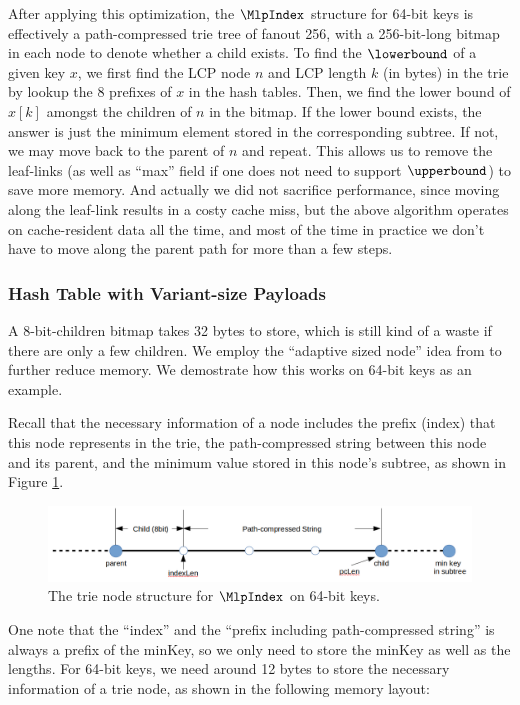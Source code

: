 \documentclass[11pt, usletter]{article}
\begin{document}
After applying this optimization, the $\MlpIndex$ structure for 64-bit keys is effectively 
a path-compressed trie tree of fanout 256, with a 256-bit-long bitmap in each node to denote whether a child exists. 
To find the $\lowerbound$ of a given key $x$, we first find the LCP node $n$ and LCP length $k$ (in bytes) in the trie 
by lookup the 8 prefixes of $x$ in the hash tables. 
Then, we find the lower bound of $x[k]$ amongst the children of $n$ in the bitmap. 
If the lower bound exists, the answer is just the minimum element stored in the corresponding subtree.
If not, we may move back to the parent of $n$ and repeat. 
This allows us to remove the leaf-links (as well as ``max'' field if one does not need to support $\upperbound$) to save more memory. 
And actually we did not sacrifice performance, since moving along the leaf-link results in a costy cache miss, 
but the above algorithm operates on cache-resident data all the time, and most of the time in practice 
we don't have to move along the parent path for more than a few steps.

\subsubsection*{Hash Table with Variant-size Payloads}

A 8-bit-children bitmap takes 32 bytes to store, which is still kind of a waste if there are only a few children. 
We employ the ``adaptive sized node'' idea from \cite{arttrie_icde13} to further reduce memory. 
We demostrate how this works on 64-bit keys as an example. 

Recall that the necessary information of a node includes the prefix (index) that this node represents in the trie, 
the path-compressed string between this node and its parent, and the minimum value stored in this node's subtree, 
as shown in Figure \ref{mlpindex64_node}.

\begin{figure}[!htb]
  \includegraphics[width=\linewidth]{mlpindex64_node.png}
\caption{The trie node structure for $\MlpIndex$ on 64-bit keys.}
\label{mlpindex64_node}
\end{figure}

One note that the ``index'' and the ``prefix including path-compressed string'' is always a prefix of the minKey, 
so we only need to store the minKey as well as the lengths. 
For 64-bit keys, we need around 12 bytes to store the necessary information of a trie node, 
as shown in the following memory layout:
\end{document}
